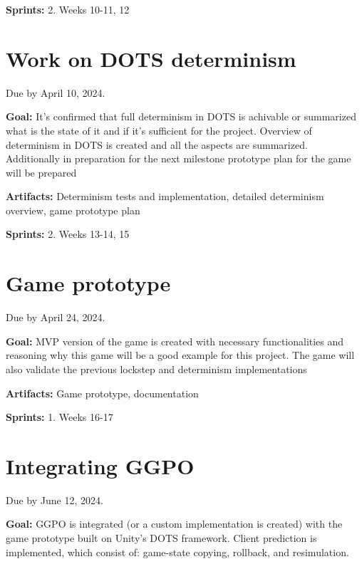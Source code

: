 \noindent\textbf{Sprints:} 2. Weeks 10-11, 12\newline

\section{Work on DOTS determinism}

Due by April 10, 2024.\newline

\noindent\textbf{Goal:} It's confirmed that full determinism in DOTS is achivable or summarized what is the state of it and if it's sufficient for the project. Overview of determinism in DOTS is created and all the aspects are summarized. Additionally in preparation for the next milestone prototype plan for the game will be prepared\newline

\noindent\textbf{Artifacts:} Determinism tests and implementation, detailed determinism overview, game prototype plan \newline

\noindent\textbf{Sprints:} 2. Weeks 13-14, 15\newline

\section{Game prototype}

Due by April 24, 2024.\newline

\noindent\textbf{Goal:} MVP version of the game is created with necessary functionalities and reasoning why this game will be a good example for this project. The game will also validate the previous lockstep and determinism implementations \newline

\noindent\textbf{Artifacts:} Game prototype, documentation\newline

\noindent\textbf{Sprints:} 1. Weeks 16-17\newline

\section{Integrating GGPO}

Due by June 12, 2024.\newline

\noindent\textbf{Goal:} GGPO is integrated (or a custom implementation is created) with the game prototype built on Unity's DOTS framework. Client prediction is implemented, which consist of: game-state copying, rollback, and resimulation.\newline

